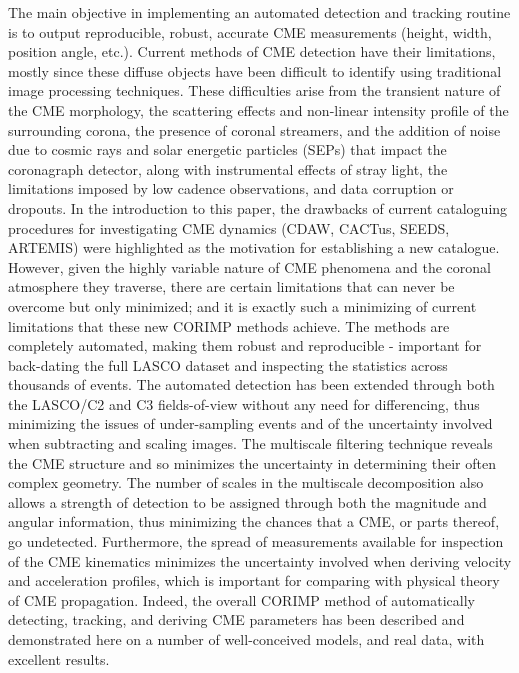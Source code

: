 \documentclass[preprint2]{aastex}
\begin{document}
The main objective in implementing an automated detection and tracking routine is to output reproducible, robust, accurate CME measurements (height, width, position angle, etc.). Current methods of CME detection have their limitations, mostly since these diffuse objects have been difficult to identify using traditional image processing techniques. These difficulties arise from the transient nature of the CME morphology, the scattering effects and non-linear intensity profile of the surrounding corona, the presence of coronal streamers, and the addition of noise due to cosmic rays and solar energetic particles (SEPs) that impact the coronagraph detector, along with instrumental effects of stray light, the limitations imposed by low cadence observations, and data corruption or dropouts. In the introduction to this paper, the drawbacks of current cataloguing procedures for investigating CME dynamics (CDAW, CACTus, SEEDS, ARTEMIS) were highlighted as the motivation for establishing a new catalogue. However, given the highly variable nature of CME phenomena and the coronal atmosphere they traverse, there are certain limitations that can never be overcome but only minimized; and it is exactly such a minimizing of current limitations that these new CORIMP methods achieve. The methods are completely automated, making them robust and reproducible - important for back-dating the full LASCO dataset and inspecting the statistics across thousands of events. The automated detection has been extended through both the LASCO/C2 and C3 fields-of-view without any need for differencing, thus minimizing the issues of under-sampling events and of the uncertainty involved when subtracting and scaling images. The multiscale filtering technique reveals the CME structure and so minimizes the uncertainty in determining their often complex geometry. The number of scales in the multiscale decomposition also allows a strength of detection to be assigned through both the magnitude and angular information, thus minimizing the chances that a CME, or parts thereof, go undetected. Furthermore, the spread of measurements available for inspection of the CME kinematics minimizes the uncertainty involved when deriving velocity and acceleration profiles, which is important for comparing with physical theory of CME propagation. Indeed, the overall CORIMP method of automatically detecting, tracking, and deriving CME parameters has been described and demonstrated here on a number of well-conceived models, and real data, with excellent results.
\end{document}

